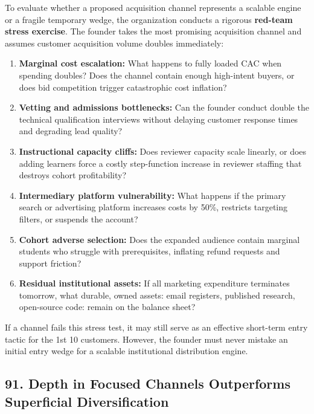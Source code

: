 To evaluate whether a proposed acquisition channel represents a scalable engine or a fragile temporary wedge, the organization conducts a rigorous \textbf{red-team stress exercise}. The founder takes the most promising acquisition channel and assumes customer acquisition volume doubles immediately:
\begin{enumerate}[leftmargin=*,itemsep=1pt]
  \item \textbf{Marginal cost escalation:} What happens to fully loaded CAC when spending doubles? Does the channel contain enough high-intent buyers, or does bid competition trigger catastrophic cost inflation?
  \item \textbf{Vetting and admissions bottlenecks:} Can the founder conduct double the technical qualification interviews without delaying customer response times and degrading lead quality?
  \item \textbf{Instructional capacity cliffs:} Does reviewer capacity scale linearly, or does adding learners force a costly step-function increase in reviewer staffing that destroys cohort profitability?
  \item \textbf{Intermediary platform vulnerability:} What happens if the primary search or advertising platform increases costs by 50\%, restricts targeting filters, or suspends the account?
  \item \textbf{Cohort adverse selection:} Does the expanded audience contain marginal students who struggle with prerequisites, inflating refund requests and support friction?
  \item \textbf{Residual institutional assets:} If all marketing expenditure terminates tomorrow, what durable, owned assets: email registers, published research, open-source code: remain on the balance sheet?
\end{enumerate}

If a channel fails this stress test, it may still serve as an effective short-term entry tactic for the 1st 10 customers. However, the founder must never mistake an initial entry wedge for a scalable institutional distribution engine.

\subsection*{91. Depth in Focused Channels Outperforms Superficial Diversification}

